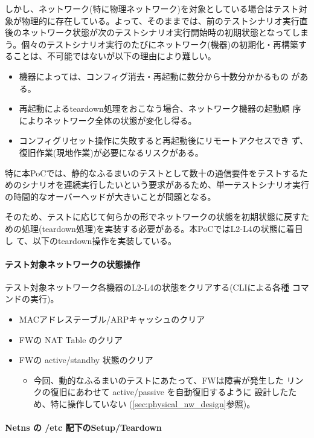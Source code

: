 しかし、ネットワーク(特に物理ネットワーク)を対象としている場合はテスト対
象が物理的に存在している。よって、そのままでは、前のテストシナリオ実行直
後のネットワーク状態が次のテストシナリオ実行開始時の初期状態となってしま
う。個々のテストシナリオ実行のたびにネットワーク(機器)の初期化・再構築す
ることは、不可能ではないが以下の理由により難しい。
\begin{itemize}
 \item 機器によっては、コンフィグ消去・再起動に数分から十数分かかるもの
       がある。
 \item 再起動によるteardown処理をおこなう場合、ネットワーク機器の起動順
       序によりネットワーク全体の状態が変化し得る。
 \item コンフィグリセット操作に失敗すると再起動後にリモートアクセスでき
       ず、復旧作業(現地作業)が必要になるリスクがある。
\end{itemize}
特に本PoCでは、静的なふるまいのテストとして数十の通信要件をテストするた
めのシナリオを連続実行したいという要求があるため、単一テストシナリオ実行
の時間的なオーバーヘッドが大きいことが問題となる。

そのため、テストに応じて何らかの形でネットワークの状態を初期状態に戻すた
めの処理(teardown処理)を実装する必要がある。本PoCではL2-L4の状態に着目し
て、以下のteardown操作を実装している。

    \paragraph{テスト対象ネットワークの状態操作}
テスト対象ネットワーク各機器のL2-L4の状態をクリアする(CLIによる各種
コマンドの実行)。
\begin{itemize}
 \item MACアドレステーブル/ARPキャッシュのクリア
 \item FWの NAT Table のクリア
 \item FWの active/standby 状態のクリア
       \begin{itemize}
        \item 今回、動的なふるまいのテストにあたって、FWは障害が発生した
              リンクの復旧にあわせて active/passive を自動復旧するように
              設計したため、特に操作していない
              (\ref{sec:physical_nw_design}参照)。
       \end{itemize}
\end{itemize}

    \paragraph{Netns の /etc 配下のSetup/Teardown}

